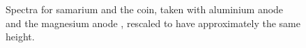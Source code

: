 \documentclass[a4paper,10pt]{scrartcl}
\begin{document}
\begin{figure}
\centering
{}
\caption{Spectra for samarium and the coin, taken with aluminium anode  and the magnesium anode , rescaled to have approximately the same height. \label{fig:sm-coin}}
\end{figure}


\nocite{skript}
\nocite{handbook}
\nocite{booklet}
\nocite{nist}



\end{document}
